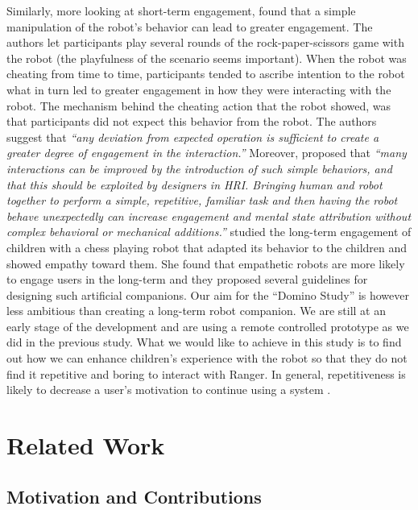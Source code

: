 \documentclass{sig-alternate}
\begin{document}
Similarly, more looking at short-term engagement, \cite{short_no_2010} found
that a simple manipulation of the robot's behavior can lead to greater
engagement. The authors let participants play several rounds of the
rock-paper-scissors game with the robot (the playfulness of the scenario seems
important). When the robot was cheating from time to time, participants tended
to ascribe intention to the robot what in turn led to greater engagement in how
they were interacting with the robot. The mechanism behind the cheating action
that the robot showed, was that participants did not expect this behavior from
the robot. The authors suggest that \textit{``any deviation from expected
operation is sufficient to create a greater degree of engagement in the
interaction.''} Moreover, \cite[p.~225]{short_no_2010} proposed that
\textit{``many interactions can be improved by the introduction of such simple
behaviors, and that this should be exploited by designers in HRI. Bringing human
and robot together to perform a simple, repetitive, familiar task and then
having the robot behave unexpectedly can increase engagement and mental state
attribution without complex behavioral or mechanical additions.''}
\cite{leite_long-term_2013} studied the long-term engagement of children with a
chess playing robot that adapted its behavior to the children and showed empathy
toward them. She found that empathetic robots are more likely to engage users in
the long-term and they proposed several guidelines for designing such artificial
companions. Our aim for the ``Domino Study'' is however less ambitious than
creating a long-term robot companion. We are still at an early stage of the
development and are using a remote controlled prototype as we did in the
previous study. What we would like to achieve in this study is to find out how
we can enhance children's experience with the robot so that they do not find it
repetitive and boring to interact with Ranger. In general, repetitiveness is
likely to decrease a user's motivation to continue using a system
\cite{bickmore_establishing_2005}.

\section{Related Work}

\subsection{Motivation and Contributions}
\end{document}
